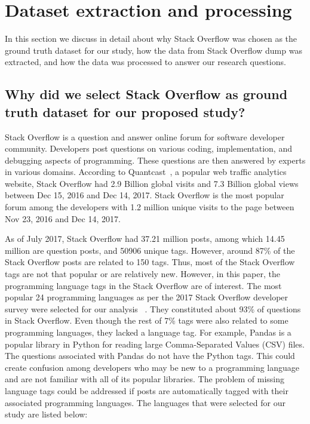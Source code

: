 \documentclass[letterpaper, 10 pt, conference]{ieeeconf}  %
\begin{document}
\section{Dataset extraction and processing}
 
In this section we discuss in detail about why Stack Overflow was chosen as the ground truth dataset for our study, how the data from Stack Overflow dump was extracted, and how the data was processed to answer our research questions. 

\subsection{Why did we select Stack Overflow as ground truth dataset for our proposed study?}
Stack Overflow is a question and answer online forum for software developer community. Developers post questions on various coding, implementation, and debugging aspects of programming. These questions are then answered by experts in various domains. According to Quantcast~\cite{c17}, a popular web traffic analytics website, Stack Overflow had 2.9 Billion global visits and 7.3 Billion global views between Dec 15, 2016 and Dec 14, 2017. Stack Overflow is the most popular forum among the developers with 1.2 million unique visits to the page between Nov 23, 2016 and Dec 14, 2017. 

As of July 2017, Stack Overflow had 37.21 million posts, among which 14.45 million are question posts, and 50906 unique tags. However, around 87\% of the Stack Overflow posts are related to 150 tags. Thus, most of the Stack Overflow tags are not that popular or are relatively new. However, in this paper, the programming language tags in the Stack Overflow are of interest. The most popular 24 programming languages as per the 2017 Stack Overflow developer survey were selected for our analysis ~\cite{c22}. They constituted about 93\% of questions in Stack Overflow. Even though the rest of 7\% tags were also related to some programming languages, they lacked a language tag. For example, Pandas is a popular library in Python for reading large Comma-Separated Values (CSV) files. The questions associated with Pandas do not have the Python tags. This could create confusion among developers who may be new to a programming language and are not familiar with all of its popular libraries. The problem of missing language tags could be addressed if posts are automatically tagged with their associated programming languages. The languages that were selected for our study are listed below: 
\end{document}
